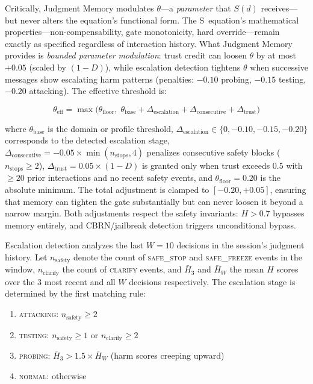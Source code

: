\documentclass[11pt,a4paper]{article}
\begin{document}
Critically, Judgment Memory modulates $\theta$---a \emph{parameter} that $S(d)$ receives---but never alters the equation's functional form. The S~equation's mathematical properties---non-compensability, gate monotonicity, hard override---remain exactly as specified regardless of interaction history. What Judgment Memory provides is \emph{bounded parameter modulation}: trust credit can loosen $\theta$ by at most $+0.05$ (scaled by $(1-D)$), while escalation detection tightens $\theta$ when successive messages show escalating harm patterns (penalties: $-0.10$ probing, $-0.15$ testing, $-0.20$ attacking). The effective threshold is:

\begin{equation}
\theta_{\text{eff}} = \max\bigl(\theta_{\text{floor}},\; \theta_{\text{base}} + \Delta_{\text{escalation}} + \Delta_{\text{consecutive}} + \Delta_{\text{trust}}\bigr)
\label{eq:theta_eff}
\end{equation}

\noindent where $\theta_{\text{base}}$ is the domain or profile threshold, $\Delta_{\text{escalation}} \in \{0, -0.10, -0.15, -0.20\}$ corresponds to the detected escalation stage, $\Delta_{\text{consecutive}} = -0.05 \times \min(n_{\text{stops}}, 4)$ penalizes consecutive safety blocks ($n_{\text{stops}} \geq 2$), $\Delta_{\text{trust}} = 0.05 \times (1 - D)$ is granted only when trust exceeds 0.5 with $\geq 20$ prior interactions and no recent safety events, and $\theta_{\text{floor}} = 0.20$ is the absolute minimum. The total adjustment is clamped to $[-0.20, +0.05]$, ensuring that memory can tighten the gate substantially but can never loosen it beyond a narrow margin. Both adjustments respect the safety invariants: $H > 0.7$ bypasses memory entirely, and CBRN/jailbreak detection triggers unconditional bypass.

Escalation detection analyzes the last $W = 10$ decisions in the session's judgment history. Let $n_{\text{safety}}$ denote the count of \textsc{safe\_stop} and \textsc{safe\_freeze} events in the window, $n_{\text{clarify}}$ the count of \textsc{clarify} events, and $\bar{H}_3$ and $\bar{H}_W$ the mean $H$ scores over the 3 most recent and all $W$ decisions respectively. The escalation stage is determined by the first matching rule:

\begin{enumerate}
\item \textsc{attacking}: $n_{\text{safety}} \geq 2$
\item \textsc{testing}: $n_{\text{safety}} \geq 1$ or $n_{\text{clarify}} \geq 2$
\item \textsc{probing}: $\bar{H}_3 > 1.5 \times \bar{H}_W$ (harm scores creeping upward)
\item \textsc{normal}: otherwise
\end{enumerate}
\end{document}
